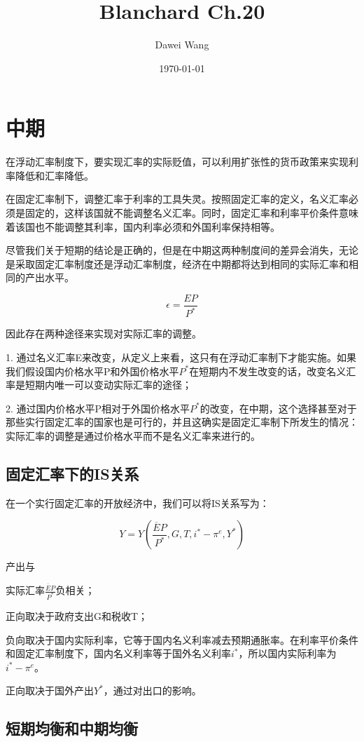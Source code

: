 \documentclass{article}
\title{Blanchard Ch.20}
\author{Dawei Wang}
\date{\today}
\begin{document}
	\maketitle

\section{中期}

在浮动汇率制度下，要实现汇率的实际贬值，可以利用扩张性的货币政策来实现利率降低和汇率降低。

在固定汇率制下，调整汇率于利率的工具失灵。按照固定汇率的定义，名义汇率必须是固定的，这样该国就不能调整名义汇率。同时，固定汇率和利率平价条件意味着该国也不能调整其利率，国内利率必须和外国利率保持相等。

尽管我们关于短期的结论是正确的，但是在中期这两种制度间的差异会消失，无论是采取固定汇率制度还是浮动汇率制度，经济在中期都将达到相同的实际汇率和相同的产出水平。

\[
\epsilon=\frac{EP}{P^*}
\]

因此存在两种途径来实现对实际汇率的调整。

1. 通过名义汇率E来改变，从定义上来看，这只有在浮动汇率制下才能实施。如果我们假设国内价格水平P和外国价格水平$ P^* $在短期内不发生改变的话，改变名义汇率是短期内唯一可以变动实际汇率的途径；

2. 通过国内价格水平P相对于外国价格水平$ P^* $的改变，在中期，这个选择甚至对于那些实行固定汇率的国家也是可行的，并且这确实是固定汇率制下所发生的情况：实际汇率的调整是通过价格水平而不是名义汇率来进行的。

\subsection{固定汇率下的IS关系}

在一个实行固定汇率的开放经济中，我们可以将IS关系写为：

\[
Y=Y(\frac{\overline{E}P}{P^*},G,T,i^*-\pi^e,Y^*)
\]

产出与

实际汇率$ \frac{\overline{E}P}{P^*} $负相关；

正向取决于政府支出G和税收T；

负向取决于国内实际利率，它等于国内名义利率减去预期通胀率。在利率平价条件和固定汇率制度下，国内名义利率等于国外名义利率$ i^* $，所以国内实际利率为$ i^*-\pi^e $。

正向取决于国外产出$ Y^* $，通过对出口的影响。

\subsection{短期均衡和中期均衡}
\end{document}
